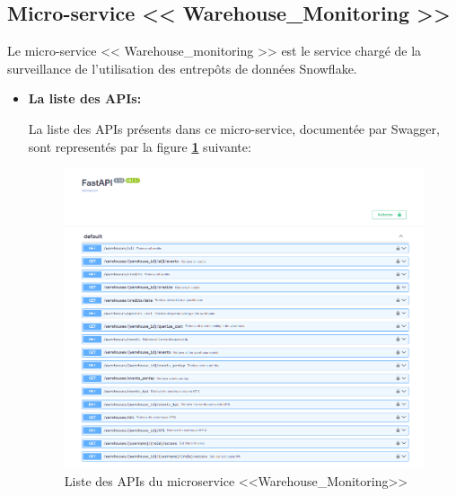 \subsection{Micro-service << Warehouse\_Monitoring >>}
\par Le micro-service << Warehouse\_monitoring >> est le service chargé de la surveillance de l'utilisation des entrepôts de données Snowflake.
\begin{itemize}
    \item \textbf{La liste des APIs:}
        \par La liste des APIs présents dans ce micro-service, documentée par Swagger, sont representés par la figure \textbf{\ref{fig:apiWare}} suivante:
        \begin{figure}[H]
            \centering
            \includegraphics[width =1\linewidth]{img/captures/warehouses_apis.PNG}
            \caption{Liste des APIs du microservice <<Warehouse\_Monitoring>> }
                \label{fig:apiWare}
        \end{figure}


\end{itemize}
